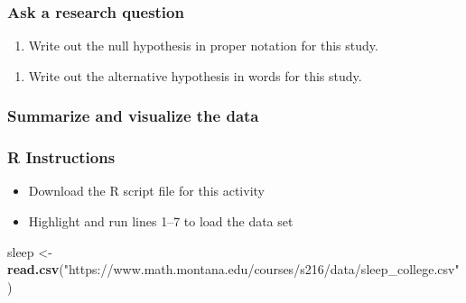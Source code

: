 \documentclass[
]{report}
\newenvironment{Shaded}{\begin{snugshade}}{\end{snugshade}}
\newcommand{\FunctionTok}[1]{\textcolor[rgb]{0.13,0.29,0.53}{\textbf{#1}}}
\newcommand{\NormalTok}[1]{#1}
\newcommand{\OtherTok}[1]{\textcolor[rgb]{0.56,0.35,0.01}{#1}}
\newcommand{\StringTok}[1]{\textcolor[rgb]{0.31,0.60,0.02}{#1}}
\providecommand{\tightlist}{%
  \setlength{\itemsep}{0pt}\setlength{\parskip}{0pt}}
\begin{document}
\subsubsection*{Ask a research question}\label{ask-a-research-question-1}

\begin{enumerate}
\def\labelenumi{\arabic{enumi}.}
\tightlist
\item
  Write out the null hypothesis in proper notation for this study.
\end{enumerate}

\vspace{0.5in}

\begin{enumerate}
\def\labelenumi{\arabic{enumi}.}
\setcounter{enumi}{1}
\tightlist
\item
  Write out the alternative hypothesis in words for this study.
\end{enumerate}

\vspace{0.8in}

\subsubsection*{Summarize and visualize the data}\label{summarize-and-visualize-the-data-2}

\subsubsection*{R Instructions}\label{r-instructions-5}

\begin{itemize}
\item
  Download the R script file for this activity
\item
  Highlight and run lines 1--7 to load the data set
\end{itemize}

\begin{Shaded}
\begin{Highlighting}[]
\NormalTok{sleep }\OtherTok{\textless{}{-}} \FunctionTok{read.csv}\NormalTok{(}\StringTok{"https://www.math.montana.edu/courses/s216/data/sleep\_college.csv"}\NormalTok{)}
\end{Highlighting}
\end{Shaded}
\end{document}

